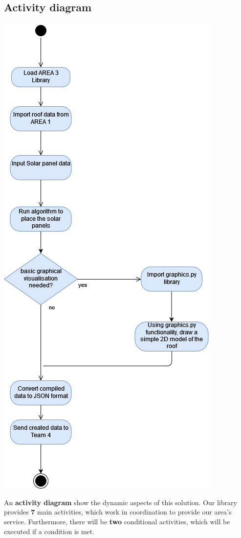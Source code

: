 \documentclass[a4paper,12pt,fleqn]{article}
\begin{document}
\subsection{Activity diagram}
\begin{center}
    \includegraphics[scale=0.4]{main/images/Activity.png}
\end{center}
An \textbf{activity diagram} show the dynamic aspects of this solution. Our library provides \textbf{7} main activities, which work in coordination to provide our area's service. Furthermore, there will be \textbf{two} conditional activities, which will be executed if a condition is met.
\end{document}

